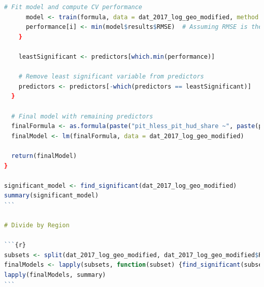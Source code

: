 \documentclass[12pt]{article}
\begin{document}
\begin{lstlisting}[language=R]
      # Fit model and compute CV performance
      model <- train(formula, data = dat_2017_log_geo_modified, method = "lm", trControl = control)
      performance[i] <- min(model$results$RMSE)  # Assuming RMSE is the chosen metric
    }
    
    leastSignificant <- predictors[which.min(performance)]
    
    # Remove least significant variable from predictors
    predictors <- predictors[-which(predictors == leastSignificant)]
  }
  
  # Final model with remaining predictors
  finalFormula <- as.formula(paste("pit_hless_pit_hud_share ~", paste(predictors, collapse = " + ")))
  finalModel <- lm(finalFormula, data = dat_2017_log_geo_modified)
  
  return(finalModel)
}

significant_model <- find_significant(dat_2017_log_geo_modified)
summary(significant_model)
```

# Divide by Region

```{r}
subsets <- split(dat_2017_log_geo_modified, dat_2017_log_geo_modified$Region)
finalModels <- lapply(subsets, function(subset) {find_significant(subset[, -which(colnames(subset) == "Region")])})
lapply(finalModels, summary)
```

\end{lstlisting}
\end{document}
